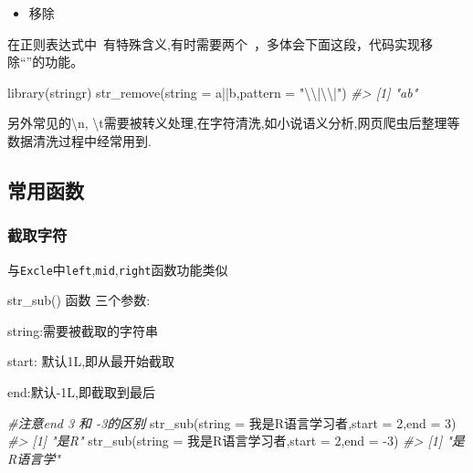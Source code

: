 \documentclass[
]{book}
\newenvironment{Shaded}{\begin{snugshade}}{\end{snugshade}}
\newcommand{\AttributeTok}[1]{\textcolor[rgb]{0.77,0.63,0.00}{#1}}
\newcommand{\CommentTok}[1]{\textcolor[rgb]{0.56,0.35,0.01}{\textit{#1}}}
\newcommand{\DecValTok}[1]{\textcolor[rgb]{0.00,0.00,0.81}{#1}}
\newcommand{\FunctionTok}[1]{\textcolor[rgb]{0.00,0.00,0.00}{#1}}
\newcommand{\NormalTok}[1]{#1}
\newcommand{\SpecialCharTok}[1]{\textcolor[rgb]{0.00,0.00,0.00}{#1}}
\newcommand{\StringTok}[1]{\textcolor[rgb]{0.31,0.60,0.02}{#1}}
\providecommand{\tightlist}{%
  \setlength{\itemsep}{0pt}\setlength{\parskip}{0pt}}
\begin{document}
\begin{itemize}
\tightlist
\item
  移除
\end{itemize}

在正则表达式中~有特殊含义,有时需要两个~，多体会下面这段，代码实现移除``\textbar\textbar{}''的功能。

\begin{Shaded}
\begin{Highlighting}[]
\FunctionTok{library}\NormalTok{(stringr)}
\FunctionTok{str\_remove}\NormalTok{(}\AttributeTok{string =} \StringTok{\textquotesingle{}a||b\textquotesingle{}}\NormalTok{,}\AttributeTok{pattern =} \StringTok{"}\SpecialCharTok{\textbackslash{}\textbackslash{}}\StringTok{|}\SpecialCharTok{\textbackslash{}\textbackslash{}}\StringTok{|"}\NormalTok{)}
\CommentTok{\#\textgreater{} [1] "ab"}
\end{Highlighting}
\end{Shaded}

另外常见的\textbackslash n, \textbackslash t需要被转义处理,在字符清洗,如小说语义分析,网页爬虫后整理等数据清洗过程中经常用到.

\hypertarget{stringr-functions}{%
\subsection{常用函数}\label{stringr-functions}}

\hypertarget{ux622aux53d6ux5b57ux7b26}{%
\subsubsection{截取字符}\label{ux622aux53d6ux5b57ux7b26}}

与\texttt{Excle}中\texttt{left},\texttt{mid},\texttt{right}函数功能类似

str\_sub() 函数 三个参数:

string:需要被截取的字符串

start: 默认1L,即从最开始截取

end:默认-1L,即截取到最后

\begin{Shaded}
\begin{Highlighting}[]
\CommentTok{\#注意end 3 和 {-}3的区别}
\FunctionTok{str\_sub}\NormalTok{(}\AttributeTok{string =} \StringTok{\textquotesingle{}我是R语言学习者\textquotesingle{}}\NormalTok{,}\AttributeTok{start =} \DecValTok{2}\NormalTok{,}\AttributeTok{end =} \DecValTok{3}\NormalTok{)}
\CommentTok{\#\textgreater{} [1] "是R"}
\FunctionTok{str\_sub}\NormalTok{(}\AttributeTok{string =} \StringTok{\textquotesingle{}我是R语言学习者\textquotesingle{}}\NormalTok{,}\AttributeTok{start =} \DecValTok{2}\NormalTok{,}\AttributeTok{end =} \SpecialCharTok{{-}}\DecValTok{3}\NormalTok{)}
\CommentTok{\#\textgreater{} [1] "是R语言学"}
\end{Highlighting}
\end{Shaded}
\end{document}
